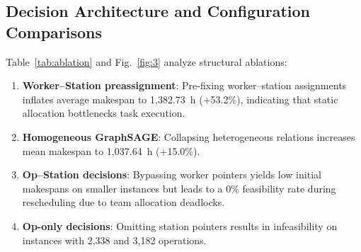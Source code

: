 \documentclass[journal,10pt]{IEEEtran}
\begin{document}
\subsection{Decision Architecture and Configuration Comparisons}

Table~\ref{tab:ablation} and Fig.~\ref{fig:3} analyze structural ablations:
\begin{enumerate}
\item \textbf{Worker--Station preassignment}: Pre-fixing worker--station assignments inflates average makespan to 1,382.73~h (+53.2\%), indicating that static allocation bottlenecks task execution.
\item \textbf{Homogeneous GraphSAGE}: Collapsing heterogeneous relations increases mean makespan to 1,037.64~h (+15.0\%).
\item \textbf{Op--Station decisions}: Bypassing worker pointers yields low initial makespans on smaller instances but leads to a 0\% feasibility rate during rescheduling due to team allocation deadlocks.
\item \textbf{Op-only decisions}: Omitting station pointers results in infeasibility on instances with 2,338 and 3,182 operations.
\end{enumerate}
\end{document}
